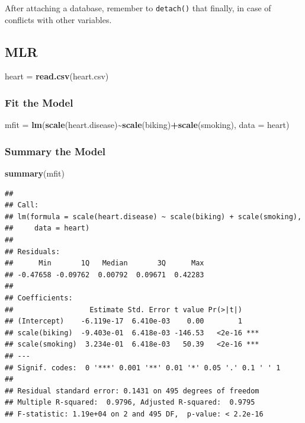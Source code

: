 \documentclass[
]{ctexart}
\newenvironment{Shaded}{\begin{snugshade}}{\end{snugshade}}
\newcommand{\AttributeTok}[1]{\textcolor[rgb]{0.13,0.29,0.53}{#1}}
\newcommand{\FunctionTok}[1]{\textcolor[rgb]{0.13,0.29,0.53}{\textbf{#1}}}
\newcommand{\NormalTok}[1]{#1}
\newcommand{\OtherTok}[1]{\textcolor[rgb]{0.56,0.35,0.01}{#1}}
\newcommand{\SpecialCharTok}[1]{\textcolor[rgb]{0.81,0.36,0.00}{\textbf{#1}}}
\newcommand{\StringTok}[1]{\textcolor[rgb]{0.31,0.60,0.02}{#1}}
\begin{document}
After attaching a database, remember to \texttt{detach()} that finally,
in case of conflicts with other variables.

\hypertarget{mlr-1}{%
\subsection{MLR}\label{mlr-1}}

\begin{Shaded}
\begin{Highlighting}[]
\NormalTok{heart }\OtherTok{=} \FunctionTok{read.csv}\NormalTok{(}\StringTok{\textquotesingle{}heart.csv\textquotesingle{}}\NormalTok{)}
\end{Highlighting}
\end{Shaded}

\hypertarget{fit-the-model}{%
\subsubsection{Fit the Model}\label{fit-the-model}}

\begin{Shaded}
\begin{Highlighting}[]
\NormalTok{mfit }\OtherTok{=} \FunctionTok{lm}\NormalTok{(}\FunctionTok{scale}\NormalTok{(heart.disease)}\SpecialCharTok{\textasciitilde{}}\FunctionTok{scale}\NormalTok{(biking)}\SpecialCharTok{+}\FunctionTok{scale}\NormalTok{(smoking),}
          \AttributeTok{data =}\NormalTok{ heart)}
\end{Highlighting}
\end{Shaded}

\hypertarget{summary-the-model}{%
\subsubsection{Summary the Model}\label{summary-the-model}}

\begin{Shaded}
\begin{Highlighting}[]
\FunctionTok{summary}\NormalTok{(mfit)}
\end{Highlighting}
\end{Shaded}

\begin{verbatim}
## 
## Call:
## lm(formula = scale(heart.disease) ~ scale(biking) + scale(smoking), 
##     data = heart)
## 
## Residuals:
##      Min       1Q   Median       3Q      Max 
## -0.47658 -0.09762  0.00792  0.09671  0.42283 
## 
## Coefficients:
##                  Estimate Std. Error t value Pr(>|t|)    
## (Intercept)    -6.119e-17  6.410e-03    0.00        1    
## scale(biking)  -9.403e-01  6.418e-03 -146.53   <2e-16 ***
## scale(smoking)  3.234e-01  6.418e-03   50.39   <2e-16 ***
## ---
## Signif. codes:  0 '***' 0.001 '**' 0.01 '*' 0.05 '.' 0.1 ' ' 1
## 
## Residual standard error: 0.1431 on 495 degrees of freedom
## Multiple R-squared:  0.9796, Adjusted R-squared:  0.9795 
## F-statistic: 1.19e+04 on 2 and 495 DF,  p-value: < 2.2e-16
\end{verbatim}
\end{document}
